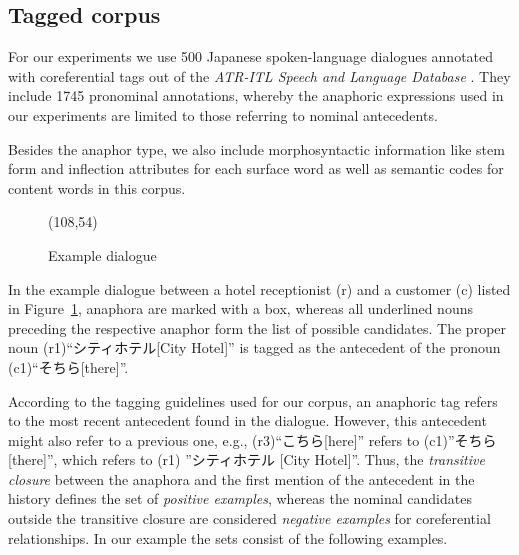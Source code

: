 \subsection{Tagged corpus}
\label{data}

For our experiments we use 500 Japanese spoken-language dialogues annotated with coreferential tags
out of the {\em ATR-ITL Speech and Language Database} \cite{Takezawa98}.
They include 1745 pronominal annotations, whereby the anaphoric expressions
used in our experiments are limited to those referring to nominal antecedents.

Besides the anaphor type, we also include morphosyntactic information like stem form and inflection
attributes for each surface word as well as semantic codes \cite{Ohno81} for content words in this corpus.

\begin{figure}[htb]
  \vspace*{-1\baselineskip}
  \begin{center}
\atari(108,54)
    \caption{Example dialogue}\label{pic-data}
  \vspace*{-1.5\baselineskip}
  \end{center}
\end{figure}

In the example dialogue between a hotel receptionist (r) and a customer (c) listed in Figure~\ref{pic-data},
anaphora are marked with a box, whereas all underlined nouns preceding the respective anaphor form the
list of possible candidates.
The proper noun (r1)``シティホテル[City Hotel]'' is tagged as the antecedent of the
pronoun (c1)``そちら[there]''.

According to the tagging guidelines used for our corpus, an anaphoric tag refers to the most recent
antecedent found in the dialogue. However, this antecedent might also refer to a previous one, e.g.,
(r3)``こちら[here]'' refers to (c1)''そちら[there]'', which refers to (r1) ''シティホテル [City Hotel]''.
Thus, the {\em transitive closure} between the anaphora and the first mention of the
antecedent in the history defines the set of {\em positive examples}, whereas
the nominal candidates outside the transitive closure are considered {\em negative examples}
for coreferential relationships. In our example the sets consist of the following examples.

\renewcommand{\arraystretch}{}

